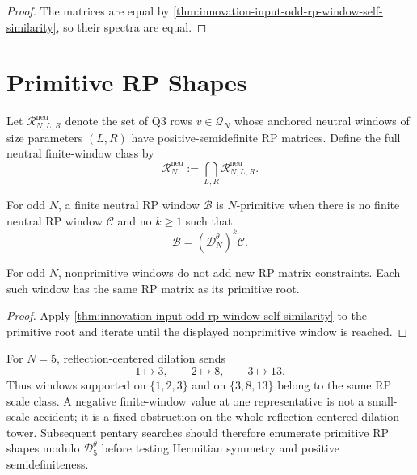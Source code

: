 \begin{proof}
The matrices are equal by
\autoref{thm:innovation-input-odd-rp-window-self-similarity}, so their
spectra are equal.
\end{proof}

\section{Primitive RP Shapes}
\label{sec:innovation-input-primitive-rp-shapes}

\begin{definition}
\label{def:innovation-input-neutral-rp-feasibility-class}
Let $\mathcal R_{N,L,R}^{\mathrm{neu}}$ denote the set of Q3 rows
$v\in\mathcal Q_N$ whose anchored neutral windows of size parameters
$(L,R)$ have positive-semidefinite RP matrices. Define the full neutral
finite-window class by
$$
\mathcal R_N^{\mathrm{neu}}
:=
\bigcap_{L,R}\mathcal R_{N,L,R}^{\mathrm{neu}}.
$$
\end{definition}

\begin{definition}
\label{def:innovation-input-reflection-centered-primitive-window}
For odd $N$, a finite neutral RP window $\mathcal B$ is
$N$-primitive when there is no finite neutral RP window $\mathcal C$ and
no $k\ge1$ such that
$$
\mathcal B=(\mathcal D_N^\theta)^k\mathcal C.
$$
\end{definition}

\begin{corollary}
\label{cor:innovation-input-primitive-window-reduction}
For odd $N$, nonprimitive windows do not add new RP matrix constraints.
Each such window has the same RP matrix as its primitive root.
\end{corollary}

\begin{proof}
Apply
\autoref{thm:innovation-input-odd-rp-window-self-similarity} to the
primitive root and iterate until the displayed nonprimitive window is
reached.
\end{proof}

\begin{principle}
\label{prin:innovation-input-pentary-primitive-search}
For $N=5$, reflection-centered dilation sends
$$
1\mapsto3,
\qquad
2\mapsto8,
\qquad
3\mapsto13.
$$
Thus windows supported on $\{1,2,3\}$ and on $\{3,8,13\}$ belong to the
same RP scale class. A negative finite-window value at one representative
is not a small-scale accident; it is a fixed obstruction on the whole
reflection-centered dilation tower. Subsequent pentary searches should
therefore enumerate primitive RP shapes modulo $\mathcal D_5^\theta$
before testing Hermitian symmetry and positive semidefiniteness.
\end{principle}
